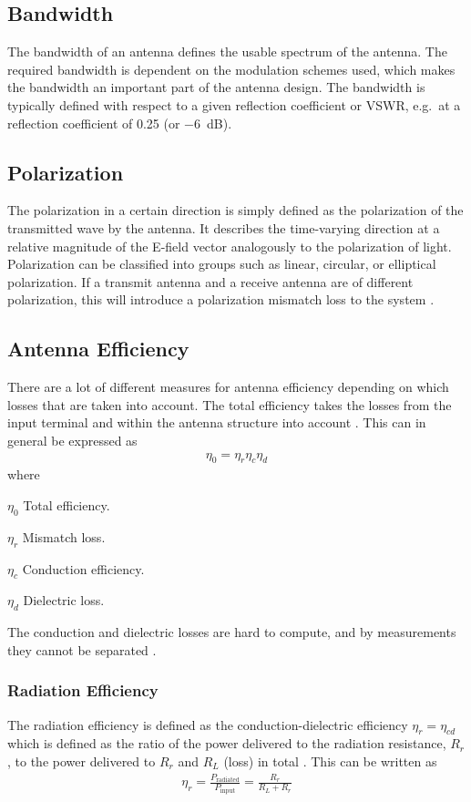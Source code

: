 \subsection{Bandwidth}
The bandwidth of an antenna defines the usable spectrum of the antenna. The required bandwidth is dependent on the modulation schemes used, which makes the bandwidth an important part of the antenna design. The bandwidth is typically defined with respect to a given reflection coefficient or VSWR, e.g.\ at a reflection coefficient of 0.25 (or \SI{-6}{dB}).

\subsection{Polarization}
The polarization in a certain direction is simply defined as the polarization of the transmitted wave by the antenna. It describes the time-varying direction at a relative magnitude of the E-field vector analogously to the polarization of light. Polarization can be classified into groups such as linear, circular, or elliptical polarization. If a transmit antenna and a receive antenna are of different polarization, this will introduce a polarization mismatch loss to the system \cite{balanis2012antenna}.

\subsection{Antenna Efficiency}
There are a lot of different measures for antenna efficiency depending on which losses that are taken into account. The total efficiency takes the losses from the input terminal and within the antenna structure into account \cite{balanis2012antenna}. This can in general be expressed as \cite{balanis2012antenna}
\begin{align}%
\label{eq:ant-eff}
  \eta_0 = \eta_r \eta_c \eta_d 
\end{align}
where
\begin{where}
\item[$\eta_0$] Total efficiency.
\item[$\eta_r$] Mismatch loss.
\item[$\eta_c$] Conduction efficiency.
\item[$\eta_d$] Dielectric loss.
\end{where}
The conduction and dielectric losses are hard to compute, and by measurements they cannot be separated \cite{balanis2012antenna}.

\subsubsection{Radiation Efficiency}
The radiation efficiency is defined as the conduction-dielectric efficiency $\eta_r = \eta_{cd}$ which is defined as the ratio of the power delivered to the radiation resistance, $R_r$, to the power delivered to $R_r$ and $R_L$ (loss) in total \cite{balanis2012antenna}. This can be written as \cite{balanis2012antenna}
\begin{align} %
  \eta_r = \frac{P_{\text{radiated}}}{P_{\text{input}}} = \frac{R_r}{R_L+R_r}
\end{align}

